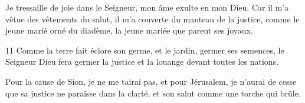  Je tressaille de joie dans le Seigneur, mon âme exulte en mon Dieu. Car il m’a vêtue des vêtements du salut, il m’a couverte du manteau de la justice, comme le jeune marié orné du diadème, la jeune mariée que parent ses joyaux.

11 Comme la terre fait éclore son germe, et le jardin, germer ses semences, le Seigneur Dieu fera germer la justice et la louange devant toutes les nations.

Pour la cause de Sion, je ne me tairai pas, et pour Jérusalem, je n’aurai de cesse que sa justice ne paraisse dans la clarté, et son salut comme une torche qui brûle.